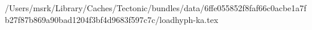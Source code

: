 /Users/msrk/Library/Caches/Tectonic/bundles/data/6ffe055852f8faf66c0acbe1a7fb27f87b869a90bad1204f3bf4d9683f597c7c/loadhyph-ka.tex